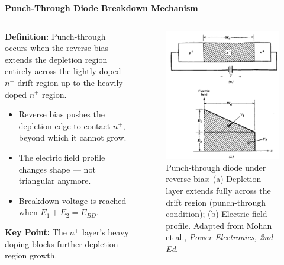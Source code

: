 \begin{frame}{\textbf{Punch-Through Diode Breakdown Mechanism}}
    \begin{columns}
    
    \begin{column}{0.5\textwidth}
    \textbf{Definition:} Punch-through occurs when the reverse bias extends the depletion region entirely across the lightly doped $n^-$ drift region up to the heavily doped $n^+$ region.
    
    \begin{itemize}
        \item Reverse bias pushes the depletion edge to contact $n^+$, beyond which it cannot grow.
        \item The electric field profile changes shape — not triangular anymore.
        \item Breakdown voltage is reached when $E_1 + E_2 = E_{BD}$.
    \end{itemize}
    
    \vspace{1em}
    \textbf{Key Point:} The $n^+$ layer's heavy doping blocks further depletion region growth.
    \end{column}
    
    \begin{column}{0.5\textwidth}
    \begin{figure}
        \centering
        \includegraphics[scale=0.25]{fig/lec04/punch_through.png}
        \caption{\scriptsize Punch-through diode under reverse bias: (a) Depletion layer extends fully across the drift region (punch-through condition); (b) Electric field profile. Adapted from Mohan et al., \textit{Power Electronics, 2nd Ed.}}
        \label{fig:punch_through_diode}
    \end{figure}
    \end{column}
    

\end{columns}
\end{frame}

